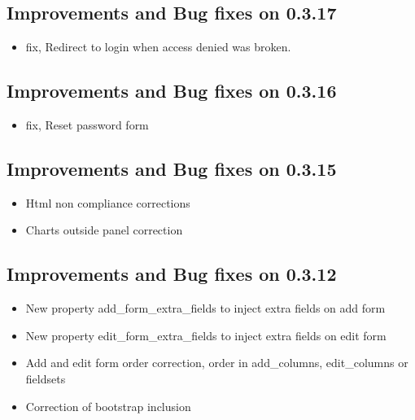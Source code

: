 \documentclass[letterpaper,10pt,english]{sphinxmanual}
\begin{document}
\subsection{Improvements and Bug fixes on 0.3.17}
\label{versions:improvements-and-bug-fixes-on-0-3-17}\begin{itemize}
\item {} 
fix, Redirect to login when access denied was broken.

\end{itemize}


\subsection{Improvements and Bug fixes on 0.3.16}
\label{versions:improvements-and-bug-fixes-on-0-3-16}\begin{itemize}
\item {} 
fix, Reset password form

\end{itemize}


\subsection{Improvements and Bug fixes on 0.3.15}
\label{versions:improvements-and-bug-fixes-on-0-3-15}\begin{itemize}
\item {} 
Html non compliance corrections

\item {} 
Charts outside panel correction

\end{itemize}


\subsection{Improvements and Bug fixes on 0.3.12}
\label{versions:improvements-and-bug-fixes-on-0-3-12}\begin{itemize}
\item {} 
New property add\_form\_extra\_fields to inject extra fields on add form

\item {} 
New property edit\_form\_extra\_fields to inject extra fields on edit form

\item {} 
Add and edit form order correction, order in add\_columns, edit\_columns or fieldsets

\item {} 
Correction of bootstrap inclusion

\end{itemize}
\end{document}
